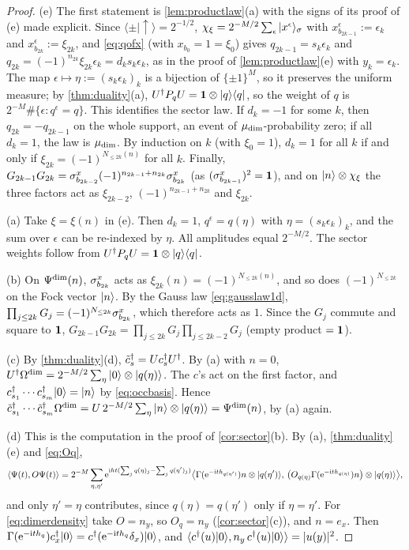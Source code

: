 \begin{proof}
(e) The first statement is \cref{lem:productlaw}(a) with the signs of its proof of (e) made explicit.
Since $\langle\pm|\uparrow\rangle=2^{-1/2}$, $\chi_\xi=2^{-M/2}\sum_\epsilon|x^\epsilon\rangle_\sigma$ with
$x^\epsilon_{b_{2k-1}}:=\epsilon_k$ and $x^\epsilon_{b_{2k}}:=\xi_{2k}$, and \eqref{eq:qofx} (with $x_{b_0}=1=\xi_0$) gives
$q_{2k-1}=s_k\epsilon_k$ and $q_{2k}=(-1)^{n_{2k}}\xi_{2k}\epsilon_k=d_ks_k\epsilon_k$, as in the proof of
\cref{lem:productlaw}(e) with $y_k=\epsilon_k$.  The map $\epsilon\mapsto\eta:=(s_k\epsilon_k)_k$ is a bijection of
$\{\pm1\}^M$, so it preserves the uniform measure; by \cref{thm:duality}(a), $U^\dagger P_qU=\mathbf{1}\otimes|q\rangle\langle q|$,
so the weight of $q$ is $2^{-M}\#\{\epsilon:q^\epsilon=q\}$.  This identifies the sector law.  If $d_k=-1$
for some $k$, then $q_{2k}=-q_{2k-1}$ on the whole support, an event of $\mu_{\mathrm{dim}}$-probability zero; if
all $d_k=1$, the law is $\mu_{\mathrm{dim}}$.  By induction on $k$ (with $\xi_0=1$), $d_k=1$ for all $k$ if and
only if $\xi_{2k}=(-1)^{N_{\le2k}(n)}$ for all $k$.  Finally,
$G_{2k-1}G_{2k}=\sigma^{x}_{b_{2k-2}}(-1)^{n_{2k-1}+n_{2k}}\sigma^{x}_{b_{2k}}$ (as $(\sigma^{x}_{b_{2k-1}})^2=\mathbf{1}$), and on
$|n\rangle\otimes\chi_\xi$ the three factors act as $\xi_{2k-2}$, $(-1)^{n_{2k-1}+n_{2k}}$ and $\xi_{2k}$.

(a) Take $\xi=\xi(n)$ in (e).  Then $d_k=1$, $q^\epsilon=q(\eta)$ with $\eta=(s_k\epsilon_k)_k$, and the
sum over $\epsilon$ can be re-indexed by $\eta$.  All amplitudes equal $2^{-M/2}$.  The sector weights
follow from $U^\dagger P_qU=\mathbf{1}\otimes|q\rangle\langle q|$.

(b) On $\Psi^{\mathrm{dim}}(n)$, $\sigma^{x}_{b_{2k}}$ acts as $\xi_{2k}(n)=(-1)^{N_{\le2k}(n)}$, and so does $(-1)^{N_{\le2k}}$
on the Fock vector $|n\rangle$.  By the Gauss law \eqref{eq:gausslaw1d},
$\prod_{j\le2k}G_j=(-1)^{N_{\le2k}}\sigma^{x}_{b_{2k}}$, which therefore acts as $1$.  Since the $G_j$ commute
and square to $\mathbf{1}$, $G_{2k-1}G_{2k}=\prod_{j\le2k}G_j\prod_{j\le2k-2}G_j$ (empty product $=\mathbf{1}$).

(c) By \cref{thm:duality}(d), $\tilde c_s^\dagger=Uc_s^\dagger U^\dagger$.  By (a) with $n=0$,
$U^\dagger\Omega^{\mathrm{dim}}=2^{-M/2}\sum_\eta|0\rangle\otimes|q(\eta)\rangle$.  The $c$'s act on the first factor,
and $c_{s_1}^\dagger\cdots c_{s_m}^\dagger|0\rangle=|n\rangle$ by \eqref{eq:occbasis}.  Hence
$\tilde c_{s_1}^\dagger\cdots\tilde c_{s_m}^\dagger\Omega^{\mathrm{dim}}=U\,2^{-M/2}\sum_\eta|n\rangle\otimes|q(\eta)\rangle=\Psi^{\mathrm{dim}}(n)$,
by (a) again.

(d) This is the computation in the proof of \cref{cor:sector}(b).  By (a), \cref{thm:duality}(e) and
\eqref{eq:Oq},
\[
  \langle\Psi(t),O\Psi(t)\rangle=2^{-M}\sum_{\eta,\eta'}\mathrm{e}^{\mathrm{i} ht(\sum_jq(\eta)_j-\sum_jq(\eta')_j)}
  \bigl\langle\Gamma(\mathrm{e}^{-\mathrm{i} th_{q(\eta')}})n\otimes|q(\eta')\rangle,\,
  \bigl(O_{q(\eta)}\Gamma(\mathrm{e}^{-\mathrm{i} th_{q(\eta)}})n\bigr)\otimes|q(\eta)\rangle\bigr\rangle ,
\]
and only $\eta'=\eta$ contributes, since $q(\eta)=q(\eta')$ only if $\eta=\eta'$.  For
\eqref{eq:dimerdensity} take $O=n_y$, so $O_q=n_y$ (\cref{cor:sector}(c)), and $n=e_x$.  Then
$\Gamma(\mathrm{e}^{-\mathrm{i} th_{q}})c_x^\dagger|0\rangle=c^\dagger(\mathrm{e}^{-\mathrm{i} th_{q}}\delta_x)|0\rangle$, and
$\langle c^\dagger(u)|0\rangle,n_y\,c^\dagger(u)|0\rangle\rangle=|u(y)|^2$.
\end{proof}

